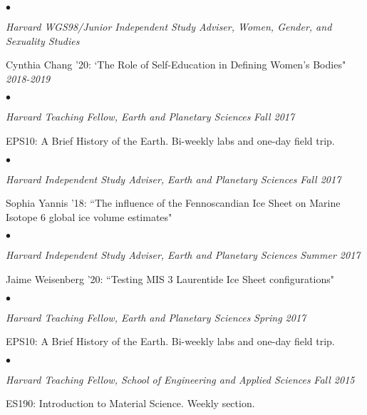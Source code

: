 \documentclass[margin,line]{res}
\newenvironment{list2}{
  \begin{list}{$\bullet$}{%
      \setlength{\itemsep}{0in}
      \setlength{\parsep}{0in} \setlength{\parskip}{0in}
      \setlength{\topsep}{0in} \setlength{\partopsep}{0in} 
      \setlength{\leftmargin}{0.00in}}}{\end{list}}
\begin{document}
\begin{resume}
\begin{list2}
\item[] {\em Harvard WGS98/Junior Independent Study Adviser, Women, Gender, and Sexuality Studies} 
\item[] Cynthia Chang '20: `The Role of Self-Education in Defining Women's Bodies" \hfill {\em  2018-2019}
\end{list2}
\vspace{0.2 cm}

\begin{list2}
\item[] {\em Harvard Teaching Fellow, Earth and Planetary Sciences} \hfill {\em  Fall 2017}
\item[] EPS10: A Brief History of the Earth. Bi-weekly labs and one-day field trip.
\end{list2}
\vspace{0.2 cm}

\begin{list2}
\item[] {\em Harvard Independent Study Adviser, Earth and Planetary Sciences} \hfill {\em  Fall 2017}
\item[] Sophia Yannis '18: ``The influence of the Fennoscandian Ice Sheet on Marine Isotope 6 global ice volume estimates"
\end{list2}
\vspace{0.2 cm}

\begin{list2}
\item[] {\em Harvard Independent Study Adviser, Earth and Planetary Sciences} \hfill {\em Summer 2017}
\item[] Jaime Weisenberg '20: ``Testing MIS 3 Laurentide Ice Sheet configurations"
\end{list2}
\vspace{0.2 cm}

\begin{list2}
\item[] {\em Harvard Teaching Fellow, Earth and Planetary Sciences} \hfill {\em  Spring 2017}
\item[] EPS10: A Brief History of the Earth. Bi-weekly labs and one-day field trip.
\end{list2}

\vspace{0.2 cm}

\begin{list2}
\item[] {\em Harvard Teaching Fellow, School of Engineering and Applied Sciences} \hfill {\em  Fall 2015}
\item[] ES190: Introduction to Material Science. Weekly section.
\end{list2}
\vspace{0.2 cm}



\end{resume}
\end{document}
